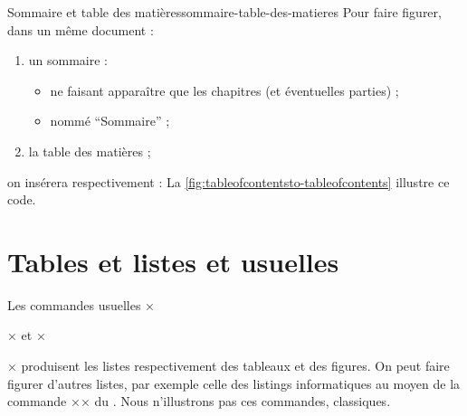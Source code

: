 \begin{dbexample}{Sommaire et table des matières}{sommaire-table-des-matieres}
  Pour faire figurer, dans un même document :
  \begin{enumerate}
  \item un sommaire :
    \begin{itemize}
    \item ne faisant apparaître que les chapitres (et éventuelles parties) ;
    \item nommé \enquote{Sommaire} ;
    \end{itemize}
  \item la table des matières ;
  \end{enumerate}
  on insérera respectivement :
   La
  \vref{fig:tableofcontentsto-tableofcontents} illustre ce code.
\end{dbexample}


\section{Tables et listes et usuelles}

Les commandes usuelles ×\listoftables× et ×\listoffigures× produisent les
listes respectivement des tableaux et des figures.
%
On peut faire figurer d'autres listes, par exemple celle des listings
informatiques au moyen de la commande ×\lstlistoflistings× du
.
%
Nous n'illustrons pas ces commandes, classiques.

%
\iffalse
\fi
